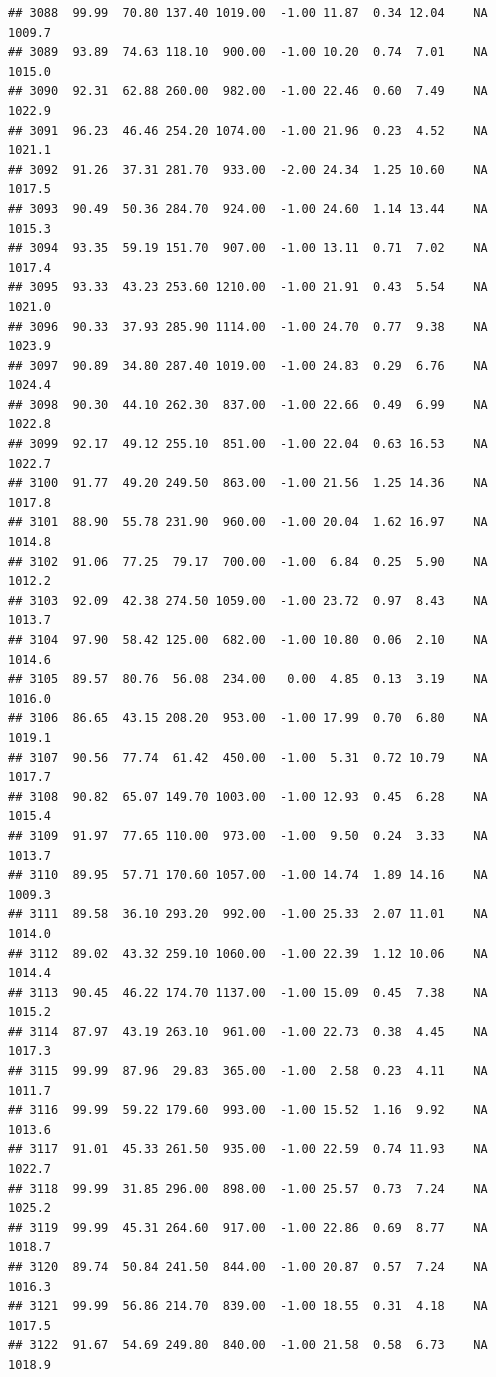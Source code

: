 \documentclass{article}\usepackage{graphicx, color}
\makeatletter
\newenvironment{kframe}{%
 \def\at@end@of@kframe{}%
 \ifinner\ifhmode%
  \def\at@end@of@kframe{\end{minipage}}%
  \begin{minipage}{\columnwidth}%
 \fi\fi%
 \def\FrameCommand##1{\hskip\@totalleftmargin \hskip-\fboxsep
 \colorbox{shadecolor}{##1}\hskip-\fboxsep
     \hskip-\linewidth \hskip-\@totalleftmargin \hskip\columnwidth}%
 \MakeFramed {\advance\hsize-\width
   \@totalleftmargin\z@ \linewidth\hsize
   \@setminipage}}%
 {\par\unskip\endMakeFramed%
 \at@end@of@kframe}
\newenvironment{knitrout}{}{} %
\makeatother
\begin{document}
\begin{knitrout}
\begin{kframe}
\begin{verbatim}
## 3088  99.99  70.80 137.40 1019.00  -1.00 11.87  0.34 12.04    NA 1009.7
## 3089  93.89  74.63 118.10  900.00  -1.00 10.20  0.74  7.01    NA 1015.0
## 3090  92.31  62.88 260.00  982.00  -1.00 22.46  0.60  7.49    NA 1022.9
## 3091  96.23  46.46 254.20 1074.00  -1.00 21.96  0.23  4.52    NA 1021.1
## 3092  91.26  37.31 281.70  933.00  -2.00 24.34  1.25 10.60    NA 1017.5
## 3093  90.49  50.36 284.70  924.00  -1.00 24.60  1.14 13.44    NA 1015.3
## 3094  93.35  59.19 151.70  907.00  -1.00 13.11  0.71  7.02    NA 1017.4
## 3095  93.33  43.23 253.60 1210.00  -1.00 21.91  0.43  5.54    NA 1021.0
## 3096  90.33  37.93 285.90 1114.00  -1.00 24.70  0.77  9.38    NA 1023.9
## 3097  90.89  34.80 287.40 1019.00  -1.00 24.83  0.29  6.76    NA 1024.4
## 3098  90.30  44.10 262.30  837.00  -1.00 22.66  0.49  6.99    NA 1022.8
## 3099  92.17  49.12 255.10  851.00  -1.00 22.04  0.63 16.53    NA 1022.7
## 3100  91.77  49.20 249.50  863.00  -1.00 21.56  1.25 14.36    NA 1017.8
## 3101  88.90  55.78 231.90  960.00  -1.00 20.04  1.62 16.97    NA 1014.8
## 3102  91.06  77.25  79.17  700.00  -1.00  6.84  0.25  5.90    NA 1012.2
## 3103  92.09  42.38 274.50 1059.00  -1.00 23.72  0.97  8.43    NA 1013.7
## 3104  97.90  58.42 125.00  682.00  -1.00 10.80  0.06  2.10    NA 1014.6
## 3105  89.57  80.76  56.08  234.00   0.00  4.85  0.13  3.19    NA 1016.0
## 3106  86.65  43.15 208.20  953.00  -1.00 17.99  0.70  6.80    NA 1019.1
## 3107  90.56  77.74  61.42  450.00  -1.00  5.31  0.72 10.79    NA 1017.7
## 3108  90.82  65.07 149.70 1003.00  -1.00 12.93  0.45  6.28    NA 1015.4
## 3109  91.97  77.65 110.00  973.00  -1.00  9.50  0.24  3.33    NA 1013.7
## 3110  89.95  57.71 170.60 1057.00  -1.00 14.74  1.89 14.16    NA 1009.3
## 3111  89.58  36.10 293.20  992.00  -1.00 25.33  2.07 11.01    NA 1014.0
## 3112  89.02  43.32 259.10 1060.00  -1.00 22.39  1.12 10.06    NA 1014.4
## 3113  90.45  46.22 174.70 1137.00  -1.00 15.09  0.45  7.38    NA 1015.2
## 3114  87.97  43.19 263.10  961.00  -1.00 22.73  0.38  4.45    NA 1017.3
## 3115  99.99  87.96  29.83  365.00  -1.00  2.58  0.23  4.11    NA 1011.7
## 3116  99.99  59.22 179.60  993.00  -1.00 15.52  1.16  9.92    NA 1013.6
## 3117  91.01  45.33 261.50  935.00  -1.00 22.59  0.74 11.93    NA 1022.7
## 3118  99.99  31.85 296.00  898.00  -1.00 25.57  0.73  7.24    NA 1025.2
## 3119  99.99  45.31 264.60  917.00  -1.00 22.86  0.69  8.77    NA 1018.7
## 3120  89.74  50.84 241.50  844.00  -1.00 20.87  0.57  7.24    NA 1016.3
## 3121  99.99  56.86 214.70  839.00  -1.00 18.55  0.31  4.18    NA 1017.5
## 3122  91.67  54.69 249.80  840.00  -1.00 21.58  0.58  6.73    NA 1018.9

\end{verbatim}
\end{kframe}
\end{knitrout}
\end{document}
